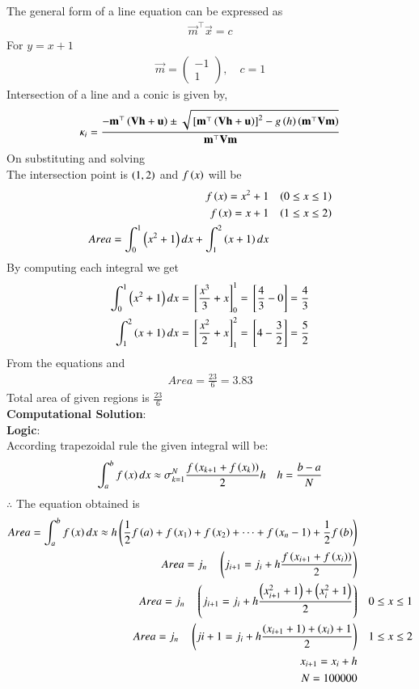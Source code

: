 \documentclass[journal]{IEEEtran}
\begin{document}
The general form of a line equation can be expressed as
\begin{align}
    \vec{m}^\top \vec{x} = c
\end{align}
For $y=x+1$
\begin{align}
    \vec{m} = \begin{pmatrix} -1 \\ 1 \end{pmatrix}, \quad c = 1
\end{align}
Intersection of a line and a conic is given by,
\begin{align}
  \kappa_i=\frac{-\mathbf{m}^{\top}\left(\mathbf{Vh}+\mathbf{u}\right)\pm\sqrt{{}\left[\mathbf{m}^{\top}\left(\mathbf{Vh}+\mathbf{u}\right)\right]^2-g\left(h\right)\left(\mathbf{m}^{\top}\mathbf{Vm}\right)}}{\mathbf{m}^{\top}\mathbf{Vm}}
\end{align}
On substituting and solving \\
The intersection point is $\left(1,2\right)$ and
$f\left(x\right)$ will be
\begin{align}
	f\left(x\right) = x^2 +1  && \left(0 \le x \le 1\right) \\
	f\left(x\right) = x+1 && \left(1 \le x \le 2\right) \\
	Area = \int_{0}^{1}\left(x^2+1\right) dx + \int_{1}^{2} \left(x+1\right) dx
\end{align}
By computing each integral we get
\begin{align}
	\int_{0}^{1}\left(x^2+1\right) dx = {}\left[\frac{x^3}{3} + x\right]_{0}^{1} = {}\left[\frac{4}{3} -0 \right] = \frac{4}{3} \\
	\int_{1}^{2}\left(x+1\right) dx = {}\left[\frac{x^2}{2} + x\right]_{1}^{2} = {}\left[4 - \frac{3}{2}\right] = \frac{5}{2}
\end{align}
From the equations  and  
\begin{align}
	Area = \frac{23}{6} = 3.83
\end{align}
Total area of given regions is $\frac{23}{6}$ \\
\textbf{Computational Solution}: \\
\textbf{Logic}: \\
According trapezoidal rule the given integral will be:
\begin{align}
	\int_{a}^{b} f\left(x\right) dx \approx \sigma_{k = 1}^{N} \frac{f\left(x_{k+1} + f\left(x_k\right)\right)}{2} h && h = \frac{b-a}{N}
\end{align}
$\therefore$ The equation obtained is
\begin{align}
	Area = \int_{a}^{b} f\left(x\right) dx \approx h\left(\frac{1}{2}f\left(a\right)+f\left(x_1\right)+ f\left(x_2\right) + \dots + f\left(x_n-1\right)+\frac{1}{2}f\left(b\right)\right) \\
	Area = j_n \quad \left(j_{i+1} = j_i + h\frac{f\left(x_{i+1} + f\left(x_i\right)\right)}{2}\right) \\
	Area = j_n \quad \left(j_{i+1} = j_i +h\frac{\left(x_{i+1}^2+1\right) +\left(x_i^2 +1\right)}{2}\right) && 0 \le x \le 1 \\
	Area = j_n \quad \left(j{i+1} = j_i + h\frac{\left(x_{i+1}+1\right)+\left(x_i\right)+1}{2}\right) && 1 \le x \le 2 \\
	x_{i+1} = x_{i} + h \\
	N = 100000
\end{align}
\end{document}
